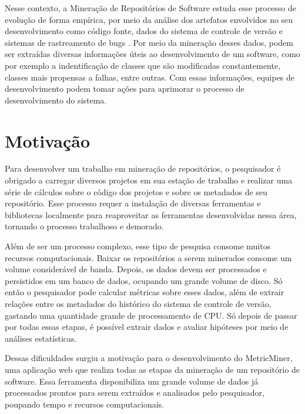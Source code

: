 \documentclass[a4paper, 12pt, twoside]{book}
\begin{document}
    Nesse contexto, a Mineração de Repositórios de Software estuda esse processo de evolução 
    de forma empírica, por meio da análise dos artefatos envolvidos no seu desenvolvimento 
    como código fonte, dados do sistema de controle de versão e sistemas de rastreamento 
    de bugs \cite{Kagdi:2007}. Por meio da mineração desses dados, podem ser extraídas diversas
    informações úteis ao desenvolvimento de um software, como por exemplo a indentificação de classes que são 
    modificadas constantemente, classes mais propensas a falhas, entre outras. Com essas informações, 
    equipes de desenvolvimento podem tomar ações para aprimorar o processo de desenvolvimento 
    do sistema.

    \section{Motivação}
        Para desenvolver um trabalho em mineração de repositórios, o pesquisador é obrigado 
        a carregar diversos projetos em sua estação de trabalho e realizar uma série de cálculos
        sobre o código dos projetos e sobre os metadados de seu repositório. Esse processo 
        requer a instalação de diversas ferramentas e bibliotecas localmente para reaproveitar
        as ferramentas desenvolvidas nessa área, tornando o processo trabalhoso e demorado.

        Além de ser um processo complexo, esse tipo de pesquisa consome muitos 
        recursos computacionais. Baixar os repositórios a serem minerados consome um volume
        considerável de banda. Depois, os dados devem ser processados e persistidos em um 
        banco de dados, ocupando um grande volume de disco. Só então o pesquisador pode 
        calcular métricas sobre esses dados, além de extrair relações entre os metadados do 
        histórico do sistema de controle de versão, gastando uma quantidade grande de
        processamento de CPU. Só depois de passar por todas essas etapas, é possível extrair
        dados e avaliar hipóteses por meio de análises estatísticas.

        Dessas dificuldades surgiu a motivação para o desenvolvimento do MetricMiner,
        uma aplicação web que realiza todas as etapas da mineração de um repositório de 
        software. Essa ferramenta disponibiliza um grande volume de dados já processados 
        prontos para serem extraídos e analisados pelo pesquisador, poupando tempo e recursos 
        computacionais.
    
\end{document}
